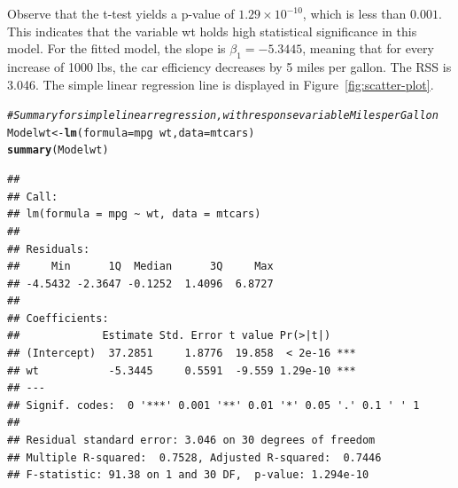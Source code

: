 \documentclass{article}\usepackage[]{graphicx}\usepackage[]{xcolor}
\makeatletter
\newcommand{\hlcom}[1]{\textcolor[rgb]{0.678,0.584,0.686}{\textit{#1}}}%
\newcommand{\hlopt}[1]{\textcolor[rgb]{0,0,0}{#1}}%
\newcommand{\hlstd}[1]{\textcolor[rgb]{0.345,0.345,0.345}{#1}}%
\newcommand{\hlkwb}[1]{\textcolor[rgb]{0.69,0.353,0.396}{#1}}%
\newcommand{\hlkwc}[1]{\textcolor[rgb]{0.333,0.667,0.333}{#1}}%
\newcommand{\hlkwd}[1]{\textcolor[rgb]{0.737,0.353,0.396}{\textbf{#1}}}%
\newenvironment{kframe}{%
 \def\at@end@of@kframe{}%
 \ifinner\ifhmode%
  \def\at@end@of@kframe{\end{minipage}}%
  \begin{minipage}{\columnwidth}%
 \fi\fi%
 \def\FrameCommand##1{\hskip\@totalleftmargin \hskip-\fboxsep
 \colorbox{shadecolor}{##1}\hskip-\fboxsep
     \hskip-\linewidth \hskip-\@totalleftmargin \hskip\columnwidth}%
 \MakeFramed {\advance\hsize-\width
   \@totalleftmargin\z@ \linewidth\hsize
   \@setminipage}}%
 {\par\unskip\endMakeFramed%
 \at@end@of@kframe}
\newenvironment{knitrout}{}{} %
\numberwithin{equation}{section}
\makeatother
\begin{document}
\noindent
Observe that the t-test yields a p-value of $1.29 \times 10^{-10}$, which is less than $0.001$. This indicates that the variable wt holds high statistical significance in this model. For the fitted model, the slope is $\beta_1 = -5.3445$, meaning that for every increase of 1000 lbs, the car efficiency decreases by 5 miles per gallon. The RSS is 3.046. The simple linear regression line is displayed in Figure~\ref{fig:scatter-plot}.

\begin{knitrout}\scriptsize
{}\color{fgcolor}\begin{kframe}
\begin{alltt}
\hlcom{# Summary for simple linear regression, with response variable Miles per Gallon}
\hlstd{Modelwt} \hlkwb{<-} \hlkwd{lm}\hlstd{(}\hlkwc{formula} \hlstd{= mpg} \hlopt{~} \hlstd{wt,} \hlkwc{data} \hlstd{= mtcars)}
\hlkwd{summary}\hlstd{(Modelwt)}
\end{alltt}
\begin{verbatim}
## 
## Call:
## lm(formula = mpg ~ wt, data = mtcars)
## 
## Residuals:
##     Min      1Q  Median      3Q     Max 
## -4.5432 -2.3647 -0.1252  1.4096  6.8727 
## 
## Coefficients:
##             Estimate Std. Error t value Pr(>|t|)    
## (Intercept)  37.2851     1.8776  19.858  < 2e-16 ***
## wt           -5.3445     0.5591  -9.559 1.29e-10 ***
## ---
## Signif. codes:  0 '***' 0.001 '**' 0.01 '*' 0.05 '.' 0.1 ' ' 1
## 
## Residual standard error: 3.046 on 30 degrees of freedom
## Multiple R-squared:  0.7528,	Adjusted R-squared:  0.7446 
## F-statistic: 91.38 on 1 and 30 DF,  p-value: 1.294e-10
\end{verbatim}
\end{kframe}
\end{knitrout}
\end{document}
